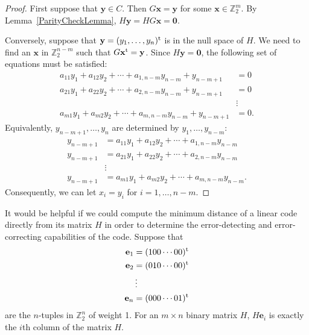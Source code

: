  
\begin{proof}
First suppose that ${\mathbf y} \in C$. Then $G {\mathbf x} = {\mathbf y}$
for some ${\mathbf x} \in {\mathbb Z}_2^m$. By Lemma~\ref{ParityCheckLemma}, $H {\mathbf y} = HG
{\mathbf x} = {\mathbf 0}$. 
 
 
Conversely, suppose that ${\mathbf y} = (y_1, \ldots, y_n)^{\rm t}$ is
in the null space of $H$.  We need to find an ${\mathbf x}$ in ${\mathbb
Z}_2^{n-m}$ such that $G {\mathbf x}^{\rm t} = {\mathbf y}$. Since $H
{\mathbf y} = {\mathbf 0}$, the following set of equations must be
satisfied:  
\begin{align*}
a_{11} y_1 + a_{12} y_2 + \cdots + a_{1, n-m} y_{n-m} + y_{n-m+1}
& = 0 \\
a_{21} y_1 + a_{22} y_2 + \cdots + a_{2, n-m} y_{n-m} + y_{n-m+1}
& = 0 \\
& \vdots   \\
a_{m1} y_1 + a_{m2} y_2 + \cdots + a_{m, n-m} y_{n-m} + y_{n-m+1}
& = 0.
\end{align*}
Equivalently, $y_{n-m+1}, \ldots, y_n$ are determined by $y_1, \ldots,
y_{n-m}$: 
\begin{align*}
y_{n-m+1}
& = a_{11} y_1 + a_{12} y_2 + \cdots + a_{1, n-m} y_{n-m} \\
y_{n-m+1}
& = a_{21} y_1 + a_{22} y_2 + \cdots + a_{2, n-m} y_{n-m} \\
& \vdots \\
y_{n-m+1}
& = a_{m1} y_1 + a_{m2} y_2 + \cdots + a_{m, n-m} y_{n-m}.
\end{align*}
Consequently, we can let $x_i = y_i$ for $i= 1, \ldots, n - m$.
\end{proof}
 
 
\medskip
 
 
It would be helpful if we could compute the minimum distance of a
linear code directly from its matrix $H$ in order to determine the
error-detecting and error-correcting capabilities of the code. Suppose
that  
\begin{align*}
{\mathbf e}_1 & = (100 \cdots 00)^{\rm t} \\
{\mathbf e}_2 & = (010 \cdots 00)^{\rm t} \\
 & \vdots \\
{\mathbf e}_n & = (000 \cdots 01)^{\rm t}
\end{align*}
are the $n$-tuples in ${\mathbb Z}_2^n$ of weight 1. For an $m \times
n$ binary matrix $H$, $H{\mathbf e}_i$ is exactly the $i$th column of
the matrix $H$. 
 
